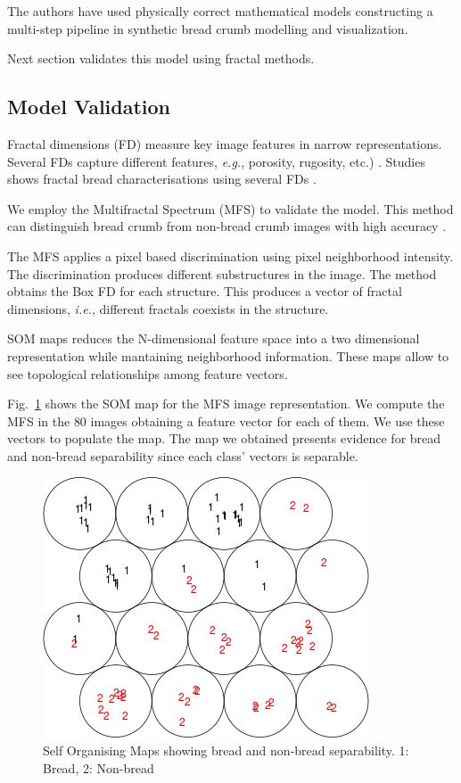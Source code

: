 \documentclass[final,5p,times]{elsarticle}
\begin{document}
The authors have used physically correct mathematical models constructing a multi-step pipeline in synthetic bread crumb modelling and visualization. 

Next section validates this model using fractal methods.

\subsection{Model Validation}

Fractal dimensions (FD) measure key image features in narrow representations. Several FDs capture different features, {\em e.g.}, porosity, rugosity, etc.) . Studies shows fractal bread characterisations using several FDs \cite{Gonzales2008,Baravalle2012}. 

We employ the Multifractal Spectrum (MFS) \cite{Xu2009} to validate the model. This method can distinguish bread crumb from non-bread crumb images with high accuracy  \cite{Baravalle2012}.

The MFS applies a pixel based discrimination using pixel neighborhood intensity. The discrimination produces different substructures in the image. The method obtains the Box FD \cite{Peitgen2004} for each structure. This produces a vector of fractal dimensions, {\em i.e.}, different fractals coexists in the structure.

SOM maps \cite{Kohonen2001} reduces the N-dimensional feature space into a two dimensional representation while mantaining neighborhood information. These maps allow to see topological relationships among feature vectors.

Fig.~\ref{FigSOM} shows the SOM map for the MFS image representation. We compute the MFS in the $80$ images obtaining a feature vector for each of them. We use these vectors to populate the map. The map we obtained presents evidence for bread and non-bread separability since each class' vectors is separable.

\begin{figure}[h!]
\includegraphics[scale=0.65]{som.png}
\caption{Self Organising Maps showing bread and non-bread separability. 1: Bread, 2: Non-bread }
\label{FigSOM}
\end{figure}
\end{document}
